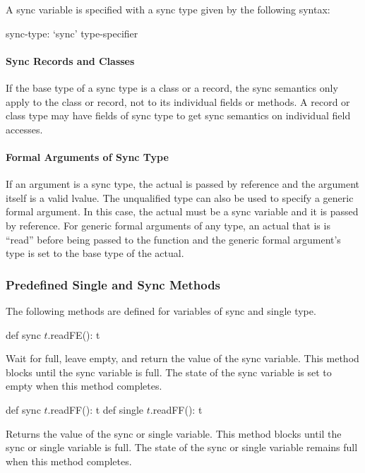 A sync variable is specified with a sync type given by the following
syntax:
\begin{syntax}
sync-type:
  `sync' type-specifier
\end{syntax}

\paragraph{Sync Records and Classes}
If the base type of a sync type is a class or a record, the sync
semantics only apply to the class or record, not to its individual
fields or methods.  A record or class type may have fields of sync
type to get sync semantics on individual field accesses.

\paragraph{Formal Arguments of Sync Type}
If an argument is a sync type, the actual is passed by reference and
the argument itself is a valid lvalue.  The unqualified
type  can also be used to specify a generic formal
argument.  In this case, the actual must be a sync variable and it
is passed by reference.  For generic formal arguments of any type, an
actual that is  is ``read'' before being passed to the
function and the generic formal argument's type is set to the base
type of the actual.

\subsubsection{Predefined Single and Sync Methods}
\label{Functions_on_Synchronization_Variables}

The following methods are defined for variables of sync and single
type.

\begin{protohead}
def sync $t$.readFE(): t
\end{protohead}
\begin{protobody}
Wait for full, leave empty, and return the value of the sync variable.
This method blocks until the sync variable is full.  The state of the
sync variable is set to empty when this method completes.
\end{protobody}

\begin{protohead}
def sync $t$.readFF(): t
def single $t$.readFF(): t
\end{protohead}
\begin{protobody}
Returns the value of the sync or single variable.  This method blocks
until the sync or single variable is full.  The state of the sync or
single variable remains full when this method completes.
\end{protobody}

